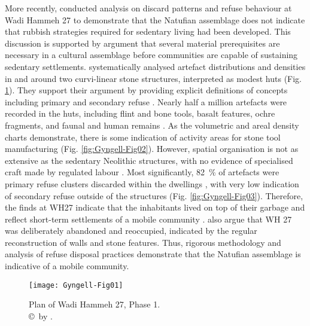 \documentclass[%
	]{ijsra}
\begin{document}
More recently, \textcite{Hardy-Smith_2004} conducted analysis on discard patterns and refuse behaviour at Wadi Hammeh 27 to demonstrate that the Natufian assemblage does not indicate that rubbish strategies required for sedentary living had been developed. 
This discussion is supported by \textcite{Fletcher_2007} argument that several material prerequisites are necessary in a cultural assemblage before communities are capable of sustaining sedentary settlements. 
\textcite[253]{Hardy-Smith_2004} systematically analysed artefact distributions and densities in and around two curvi-linear stone structures, interpreted as modest huts (Fig. \ref{fig:Gyngell-Fig01}). 
They support their argument by providing explicit definitions of concepts including primary and secondary refuse \parencite[255]{Hardy-Smith_2004}. 
Nearly half a million artefacts were recorded in the huts, including flint and bone tools, basalt features, ochre fragments, and faunal and human remains \parencite[279]{Hardy-Smith_2004}. 
As the volumetric and areal density charts demonstrate, there is some indication of activity areas for stone tool manufacturing (Fig. \ref{fig:Gyngell-Fig02}). However, spatial organisation is not as extensive as the sedentary Neolithic structures, with no evidence of specialised craft made by regulated labour \parencite[282]{Hardy-Smith_2004}. 
Most significantly, \SI{82}{\percent} of artefacts were primary refuse clusters discarded within the dwellings \parencite[279]{Hardy-Smith_2004}, with very low indication of secondary refuse outside of the structures (Fig. \ref{fig:Gyngell-Fig03}). 
Therefore, the finds at WH27 indicate that the inhabitants lived on top of their garbage and reflect short-term settlements of a mobile community \parencite[285]{Hardy-Smith_2004}. 
\textcite[259]{Hardy-Smith_2004} also argue that WH 27 was deliberately abandoned and reoccupied, indicated by the regular reconstruction of walls and stone features. Thus, rigorous methodology and analysis of refuse disposal practices demonstrate that the Natufian assemblage is indicative of a mobile community.

\begin{figure}[!htb] %
\texttt{[image: Gyngell-Fig01]}
\caption{Plan of Wadi Hammeh 27, Phase 1.
        {\normalfont\scriptsize \\ \copyright\ by 
	 \textcite{Hardy-Smith_2004}.}}
\label{fig:Gyngell-Fig01}
\end{figure}
\end{document}
